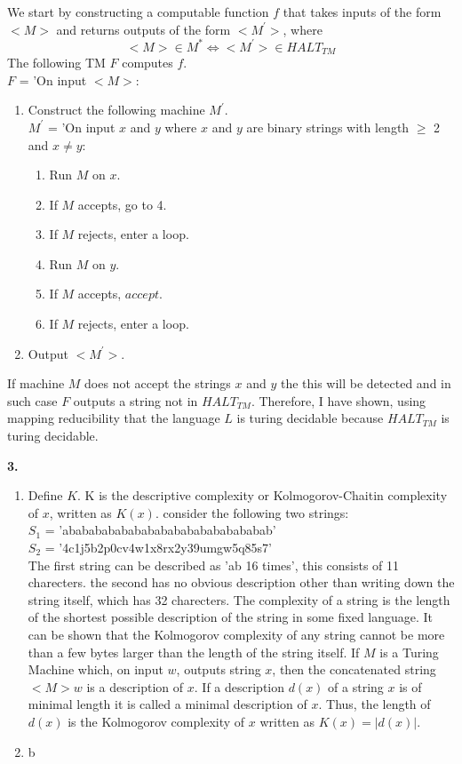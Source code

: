 \documentclass[a4paper,12pt]{article}
\begin{document}
\begin{enumerate}[label=\alph*)]
We start by constructing a computable function $f$ that takes inputs of the form $<M>$ and returns outputs of the form $<M^{'}>$, where 
$$<M> \in M^{*} \iff <M^{'}> \in HALT_{TM}$$
The following TM $F$ computes $f$. \\
$F$ = 'On input $<M>$:
\begin{enumerate}[label=\arabic*)]
\item Construct the following machine $M^{'}$. \\
$M^{'}$ = 'On input $x$ and $y$ where $x$ and $y$ are binary strings with length $\geq$ 2 and $x \neq y$: 
\begin{enumerate}[label=\arabic*)]
\item Run $M$ on $x$.
\item If $M$ accepts, go to 4.
\item If $M$ rejects, enter a loop.
\item Run $M$ on $y$.
\item If $M$ accepts, $accept$.
\item If $M$ rejects, enter a loop.
\end{enumerate}
\item Output $<M^{'}>$.
\end{enumerate}
If machine $M$ does not accept the strings $x$ and $y$ the this will be detected and in such case $F$ outputs a string not in $HALT_{TM}$. Therefore, I have shown, using mapping reducibility that the language $L$ is turing decidable because $HALT_{TM}$ is turing decidable. 
\end{enumerate}
\newpage
\noindent \textbf{3.}
\begin{enumerate}[label=\alph*)]
\item Define $K$. K is the descriptive complexity or Kolmogorov-Chaitin complexity of $x$, written as $K(x)$. consider the following two strings: \\
$S_1$ = 'abababababababababababababababab'\\
$S_2$ = '4c1j5b2p0cv4w1x8rx2y39umgw5q85s7'\\
The first string can be described as 'ab 16 times', this consists of 11 charecters. the second has no obvious description other than writing down the string itself, which has 32 charecters. The complexity of a string is the length of the shortest possible description of the string in some fixed language. It can be shown that the Kolmogorov complexity of any string cannot be more than a few bytes larger than the length of the string itself. If $M$ is a Turing Machine which, on input $w$, outputs string $x$, then the concatenated string $<M> w$ is a description of $x$. If a description $d(x)$ of a string $x$ is of minimal length it is called a minimal description of $x$. Thus, the length of $d(x)$ is the Kolmogorov complexity of $x$ written as $K(x) = |d(x)|$.
\item b
\end{enumerate}
\end{document}
